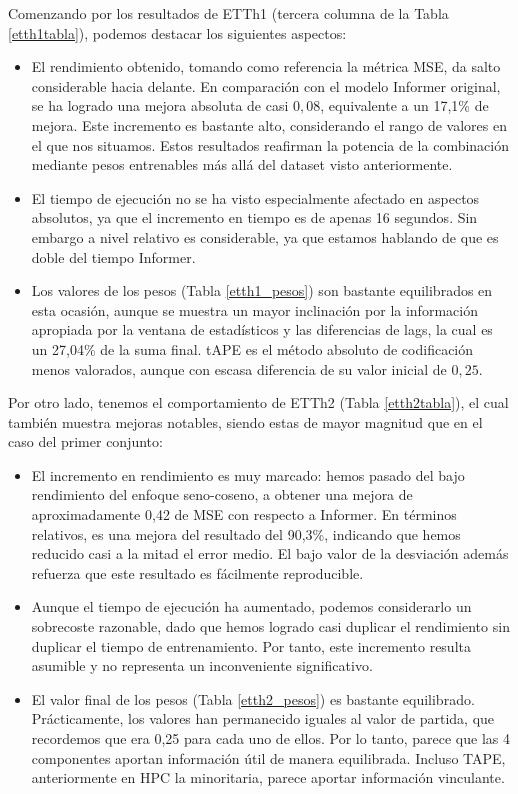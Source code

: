 Comenzando por los resultados de ETTh1 (tercera columna de la Tabla \ref{etth1tabla}), podemos destacar los siguientes aspectos:

\begin{itemize}
	\item El rendimiento obtenido, tomando como referencia la métrica MSE, da salto considerable hacia delante. En comparación con el modelo Informer original, se ha logrado una mejora absoluta de casi $0,08$, equivalente a un 17,1\% de mejora. Este incremento es bastante alto, considerando el rango de valores en el que nos situamos. Estos resultados reafirman la potencia de la combinación mediante pesos entrenables más allá del dataset visto anteriormente.
	\item El tiempo de ejecución no se ha visto especialmente afectado en aspectos absolutos, ya que el incremento en tiempo es de apenas 16 segundos. Sin embargo a nivel relativo es considerable, ya que estamos hablando de que es doble del tiempo Informer.
	\item Los valores de los pesos (Tabla \ref{etth1_pesos}) son bastante equilibrados en esta ocasión, aunque se muestra un mayor inclinación por la información apropiada por la ventana de estadísticos y las diferencias de lags, la cual es un 27,04\% de la suma final. tAPE es el método absoluto de codificación menos valorados, aunque con escasa diferencia de su valor inicial de $0,25$.
\end{itemize}

Por otro lado, tenemos el comportamiento de ETTh2 (Tabla \ref{etth2tabla}), el cual también muestra mejoras notables, siendo estas de mayor magnitud que en el caso del primer conjunto:

 \begin{itemize}
 	\item El incremento en rendimiento es muy marcado: hemos pasado del bajo rendimiento del enfoque seno-coseno, a obtener una mejora de aproximadamente 0,42 de MSE con respecto a Informer. En términos relativos, es una mejora del resultado del 90,3\%, indicando que hemos reducido casi a la mitad el error medio. El bajo valor de la desviación además refuerza que este resultado es fácilmente reproducible.
 	
 	\item Aunque el tiempo de ejecución ha aumentado, podemos considerarlo un sobrecoste razonable, dado que hemos logrado casi duplicar el rendimiento sin duplicar el tiempo de entrenamiento. Por tanto, este incremento resulta asumible y no representa un inconveniente significativo.
 	
 	\item El valor final de los pesos (Tabla \ref{etth2_pesos}) es bastante equilibrado. Prácticamente, los valores han permanecido iguales al valor de partida, que recordemos que era 0,25 para cada uno de ellos. Por lo tanto, parece que las 4 componentes aportan información útil de manera equilibrada. Incluso TAPE, anteriormente en HPC la minoritaria, parece aportar información vinculante.
 \end{itemize}
 
